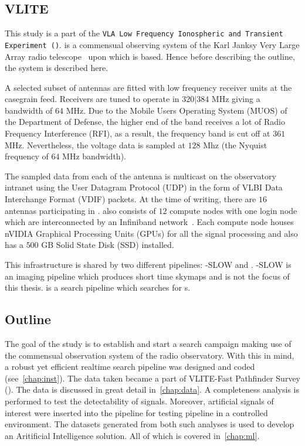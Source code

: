 \subsection{VLITE}

\par This study is a part of the \texttt{VLA Low Frequency Ionospheric and Transient Experiment (\vlite)}. 
\vlite is a commensual observing system of the Karl Janksy Very Large Array radio telescope~\cite{vla} upon which \vf is based. 
Hence before describing the outline, the \vlite system is described here.

\par A selected subset of \vla antennas are fitted with low frequency receiver units at the casegrain feed. 
Receivers are tuned to operate in $320|384$ MHz giving a bandwidth of $64$ MHz. Due to the Mobile Users Operating System (MUOS) of the Department of Defense, the higher end of the band receives a lot of Radio Frequency Interference (RFI), as a result, the frequency band is cut off at $361$ MHz. Nevertheless, the voltage data is sampled at $128$ Mhz (the Nyquist frequency of $64$ MHz bandwidth).
\par The sampled data from each of the antenna is multicast on the observatory intranet using the User Datagram Protocol (UDP) in the form of VLBI Data Interchange Format (VDIF) packets. At the time of writing, there are $16$ \vla antennas participating in \vlite. \vlite also consists of $12$ compute nodes with one login node which are interconnected by an Infiniband network~\cite{infiniband}. 
Each compute node houses nVIDIA Graphical Processing Units (GPUs) for all the signal processing and also has a $500$ GB Solid State Disk (SSD) installed.

\par This infrastructure is shared by two different pipelines: \vlite-SLOW and \vf. \vlite-SLOW is an imaging pipeline which produces short time skymaps and is not the focus of this thesis. \vf is a search pipeline which searches for \frb{}s.

\subsection{Outline}

\par The goal of the study is to establish and start a search campaign making use of the commensual observation system \vlite of the \vla radio observatory.
With this in mind, a robust yet efficient realtime search pipeline was designed and coded (see~\autoref{chap:inst}).
The data taken became a part of VLITE-Fast Pathfinder Survey (\vfpfs). The data is discussed in great detail in~\autoref{chap:data}.
A completeness analysis is performed to test the detectability of signals. Moreover, artificial signals of interest were inserted into the pipeline for testing pipeline in a controlled environment. The datasets generated from both such analyses is used to develop an Aritificial Intelligence solution. 
All of which is covered in~\autoref{chap:ml}.

